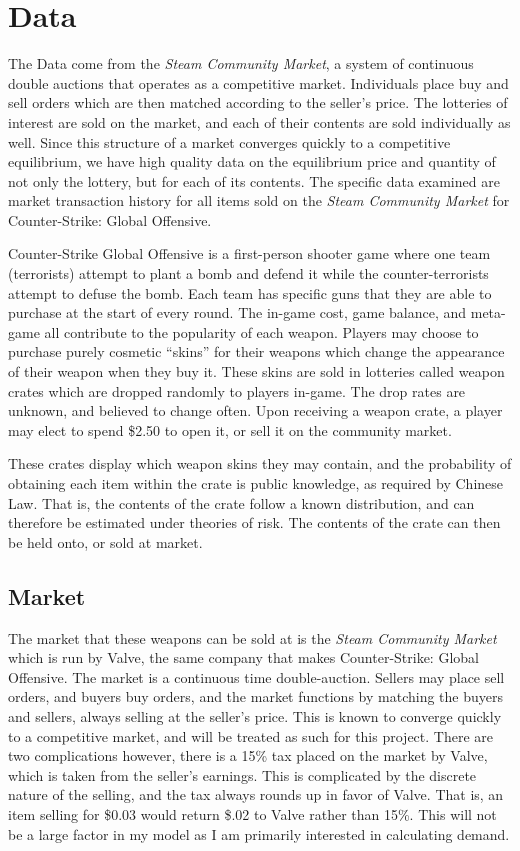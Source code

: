 \documentclass[12pt]{paper}
\begin{document}
\section{Data}

The Data come from the \emph{Steam Community Market}, a system of
continuous double auctions that operates as a competitive
market. Individuals place buy and sell orders which are then matched
according to the seller's price. The lotteries of interest are sold on
the market, and each of their contents are sold individually as
well. Since this structure of a market converges quickly to a
competitive equilibrium, we have high quality data on the equilibrium
price and quantity of not only the lottery, but for each of its
contents. The specific data examined are market transaction history
for all items sold on the \emph{Steam Community Market} for
Counter-Strike: Global Offensive.

Counter-Strike Global Offensive is a first-person shooter game where
one team (terrorists) attempt to plant a bomb and defend it while the
counter-terrorists attempt to defuse the bomb. Each team has specific
guns that they are able to purchase at the start of every round. The
in-game cost, game balance, and meta-game all contribute to the
popularity of each weapon. Players may choose to purchase purely
cosmetic ``skins'' for their weapons which change the appearance of
their weapon when they buy it. These skins are sold in lotteries
called weapon crates which are dropped randomly to players
in-game. The drop rates are unknown, and believed to change
often. Upon receiving a weapon crate, a player may elect to spend
\$2.50 to open it, or sell it on the community market.

These crates display which weapon skins they may contain, and the
probability of obtaining each item within the crate is public
knowledge, as required by Chinese Law. That is, the contents of the
crate follow a known distribution, and can therefore be estimated
under theories of risk. The contents of the crate can then be held
onto, or sold at market.
 

\subsection{Market}


The market that these weapons can be sold at is the \emph{Steam
  Community Market} which is run by Valve, the same company that makes
Counter-Strike: Global Offensive. The market is a continuous time
double-auction. Sellers may place sell orders, and buyers buy orders,
and the market functions by matching the buyers and sellers, always
selling at the seller's price. This is known to converge quickly to a
competitive market, and will be treated as such for this
project. \cite{Efficiency} There are two complications however, there is a 15\% tax
placed on the market by Valve, which is taken from the seller's
earnings. This is complicated by the discrete nature of the selling,
and the tax always rounds up in favor of Valve. That is, an item
selling for \$0.03 would return \$.02 to Valve rather than 15\%. This
will not be a large factor in my model as I am primarily interested in
calculating demand.
\end{document}
